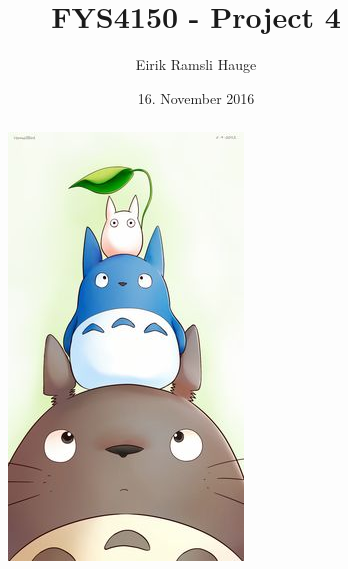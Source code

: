 \documentclass{article}
\title{FYS4150 - Project 4}
\author{Eirik Ramsli Hauge}
\date{16. November 2016}
\begin{document}
\maketitle
\begin{abstract}
\begin{figure}[H]
\centering
\includegraphics[scale=0.5]{../figures/totoro.jpg}
\end{figure}
\end{abstract}
\end{document}
